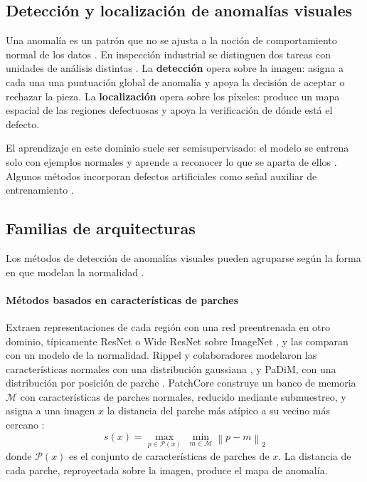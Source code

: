 \documentclass[12pt,oneside]{report}
\begin{document}
\subsection{Detección y localización de anomalías visuales}

Una anomalía es un patrón que no se ajusta a la noción de comportamiento normal de los datos \cite{chandola2009}. En inspección industrial se distinguen dos tareas con unidades de análisis distintas \cite{bergmann2021}. La \textbf{detección} opera sobre la imagen: asigna a cada una una puntuación global de anomalía y apoya la decisión de aceptar o rechazar la pieza. La \textbf{localización} opera sobre los píxeles: produce un mapa espacial de las regiones defectuosas y apoya la verificación de dónde está el defecto.

El aprendizaje en este dominio suele ser semisupervisado: el modelo se entrena solo con ejemplos normales y aprende a reconocer lo que se aparta de ellos \cite{ruff2021}. Algunos métodos incorporan defectos artificiales como señal auxiliar de entrenamiento \cite{zavrtanik2021,li2021}.

\subsection{Familias de arquitecturas}

Los métodos de detección de anomalías visuales pueden agruparse según la forma en que modelan la normalidad \cite{liu2024}.

\paragraph{Métodos basados en características de parches} Extraen representaciones de cada región con una red preentrenada en otro dominio, típicamente ResNet o Wide ResNet sobre ImageNet \cite{he2016,zagoruyko2016,deng2009}, y las comparan con un modelo de la normalidad. Rippel y colaboradores modelaron las características normales con una distribución gaussiana \cite{rippel2020}, y PaDiM, con una distribución por posición de parche \cite{defard2021}. PatchCore construye un banco de memoria $\mathcal{M}$ con características de parches normales, reducido mediante submuestreo, y asigna a una imagen $x$ la distancia del parche más atípico a su vecino más cercano \cite{roth2022}:
\begin{equation}
  s(x) = \max_{p \in \mathcal{P}(x)} \; \min_{m \in \mathcal{M}} \left\lVert p - m \right\rVert_2
\end{equation}
donde $\mathcal{P}(x)$ es el conjunto de características de parches de $x$. La distancia de cada parche, reproyectada sobre la imagen, produce el mapa de anomalía.
\end{document}
